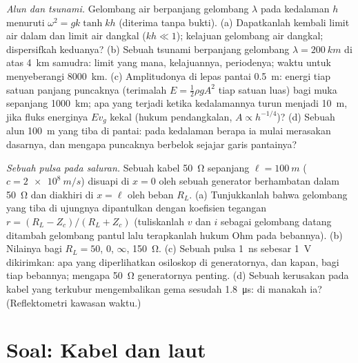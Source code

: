 \begin{exercise}[$\star\star\star$]\label{exo:b2:dispersion-wave-packets:11}
\emph{Alun dan tsunami.} Gelombang air berpanjang gelombang $\lambda$ pada kedalaman $h$
menuruti $\omega^2 = gk\tanh kh$ (diterima tanpa bukti). (a) Dapatkanlah kembali limit air dalam dan
limit air dangkal ($kh \ll 1$); kelajuan gelombang air dangkal; dispersifkah
keduanya? (b) Sebuah tsunami berpanjang gelombang $\lambda = \qty{200}{km}$ di atas \qty{4}{km} samudra:
limit yang mana, kelajuannya, periodenya; waktu untuk menyeberangi \qty{8000}{km}. (c) Amplitudonya
di lepas pantai \qty{0.5}{m}: energi tiap satuan panjang puncaknya
(terimalah $E = \tfrac12\rho gA^2$ tiap satuan luas) bagi muka sepanjang \qty{1000}{km}; apa yang
terjadi ketika kedalamannya turun menjadi \qty{10}{m}, jika fluks energinya $Ev_g$
kekal (hukum pendangkalan, $A \propto h^{-1/4}$)? (d) Sebuah alun \qty{100}{m}
yang tiba di pantai: pada kedalaman berapa ia mulai merasakan dasarnya,
dan mengapa puncaknya berbelok sejajar garis pantainya?
\end{exercise}

\begin{exercise}[$\star\star\star$]\label{exo:b2:dispersion-wave-packets:12}
\emph{Sebuah pulsa pada saluran.} Sebuah kabel \qty{50}{\ohm} sepanjang $\ell = \qty{100}{m}$
($c = \qty{2e8}{m/s}$) disuapi di $x = 0$ oleh sebuah generator berhambatan
dalam \qty{50}{\ohm} dan diakhiri di $x = \ell$ oleh beban $R_L$. (a) Tunjukkanlah
bahwa gelombang yang tiba di ujungnya dipantulkan dengan koefisien
tegangan $r = (R_L - Z_c)/(R_L + Z_c)$ (tuliskanlah $v$ dan $i$ sebagai gelombang datang
ditambah gelombang pantul lalu terapkanlah hukum Ohm pada bebannya). (b) Nilainya bagi
$R_L = 50$, $0$, $\infty$, \qty{150}{\ohm}. (c) Sebuah pulsa \qty{1}{ns} sebesar \qty{1}{V}
dikirimkan: apa yang diperlihatkan osiloskop di generatornya, dan kapan, bagi tiap
bebannya; mengapa \qty{50}{\ohm} generatornya penting. (d) Sebuah kerusakan pada kabel
yang terkubur mengembalikan gema sesudah \qty{1.8}{\micro s}: di manakah ia? (Reflektometri
kawasan waktu.)
\end{exercise}

\section{Soal: Kabel dan laut}

